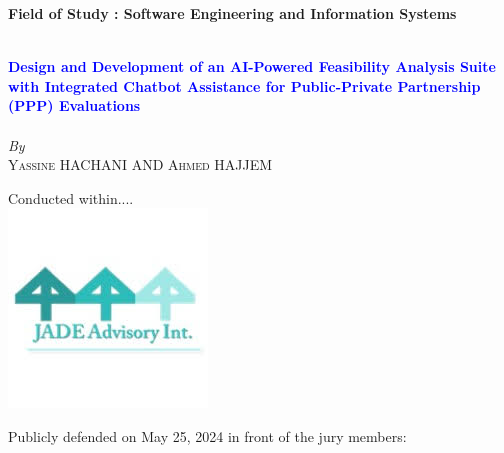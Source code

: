 \begin{titlepage}
\textbf{Field of Study : Software Engineering and Information Systems}

\vskip1cm%


\HRule \\[0.4cm]
\textcolor{blue}{\large \bfseries Design and Development of an AI-Powered Feasibility Analysis Suite with Integrated Chatbot Assistance for Public-Private Partnership (PPP) Evaluations}\\[0.2cm] %
\HRule \\[1cm]

\vskip0.5cm%
\textit{By}\\
\textsc{\large Yassine HACHANI AND Ahmed HAJJEM}\\[0.5cm] %
\vskip0.5cm%

{Conducted within....}\\
\includegraphics[width=0.2\columnwidth]{assets/jade_advisory.jpg}\\

\vskip1cm
 
 \begin{flushleft}
Publicly defended on May 25, 2024 in front of the jury members:
\smallskip


\end{flushleft}
\end{titlepage}
